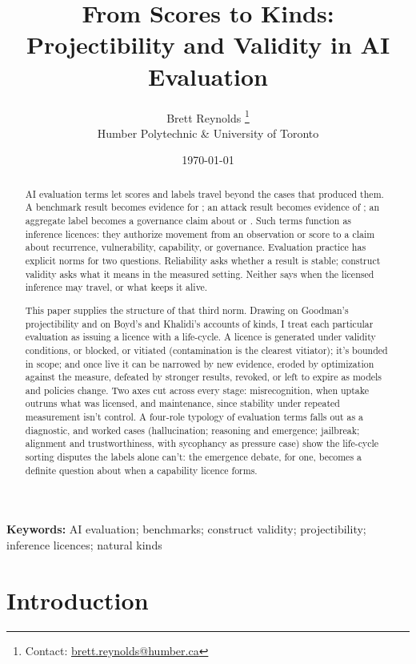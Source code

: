 \documentclass[12pt]{article}
\title{From Scores to Kinds: Projectibility and Validity in AI Evaluation}
\author{Brett Reynolds \orcidlink{0000-0003-0073-7195}%
\thanks{Contact: \href{mailto:brett.reynolds@humber.ca}{brett.reynolds@humber.ca}}\\
Humber Polytechnic \& University of Toronto}
\date{\today}
\begin{document}
\maketitle

\begin{abstract}
AI evaluation terms let scores and labels travel beyond the cases that
produced them. A benchmark result becomes evidence for ; an
attack result becomes evidence of ; an aggregate
label becomes a governance claim about  or
. Such terms function as inference licences: they
authorize movement from an observation or score to a claim about recurrence,
vulnerability, capability, or governance. Evaluation practice has explicit
norms for two questions. Reliability asks whether a result is stable;
construct validity asks what it means in the measured setting. Neither says
when the licensed inference may travel, or what keeps it alive.

This paper supplies the structure of that third norm. Drawing on Goodman's
projectibility and on Boyd's and Khalidi's accounts of kinds, I treat each
particular evaluation as issuing a licence with a life-cycle. A licence is
generated under validity conditions, or blocked, or vitiated (contamination
is the clearest vitiator); it's bounded in scope; and once live it can be
narrowed by new evidence, eroded by optimization against the measure,
defeated by stronger results, revoked, or left to expire as models and
policies change. Two axes cut across every stage: misrecognition, when
uptake outruns what was licensed, and maintenance, since stability under
repeated measurement isn't control. A four-role typology of evaluation terms
falls out as a diagnostic, and worked cases (hallucination; reasoning and
emergence; jailbreak; alignment and trustworthiness, with sycophancy as
pressure case) show the life-cycle sorting disputes the labels alone can't:
the emergence debate, for one, becomes a definite question about when a
capability licence forms.
\end{abstract}

\medskip
\noindent\textbf{Keywords:} AI evaluation; benchmarks; construct validity;
projectibility; inference licences; natural kinds

\section{Introduction}\label{sec:introduction}
\end{document}
